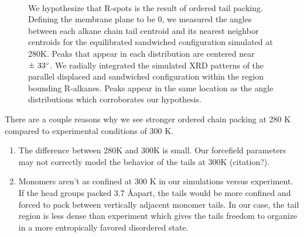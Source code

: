 \documentclass{article}
\begin{document}
\begin{figure}[!htb]
\begin{subfigure}{\linewidth}
\begin{subfigure}{0.45\textwidth}
		\end{subfigure}
	\end{subfigure} 
    \caption{We hypothesize that R-spots is the result of ordered tail packing.
	  Defining the membrane plane to be 0\degree, we measured the angles between each
	  alkane chain tail centroid and its nearest neighbor centroids for the
	  equilibrated sandwiched configuration simulated at 280K. Peaks
	  that appear in each distribution are centered near $\pm~33\degree$. We radially
	  integrated the simulated XRD patterns of the parallel displaced and sandwiched
	  configuration within the region bounding R-alkanes.
	  Peaks appear in the same location as the angle distributions which corroborates
	  our hypothesis.}~\label{fig:tail_packing}
  \end{figure}  
  
  There are a couple reasons why we see stronger ordered chain packing at 280 K compared to
  experimental conditions of 300 K.
  \begin{enumerate}
  		\item The difference between 280K and 300K is small. Our forcefield parameters
  		may not correctly model the behavior of the tails at 300K (citation?).
  		\item Monomers aren't as confined at 300 K in our simulations versus experiment.
  		If the head groups packed 3.7 \AA apart, the tails would be more confined and forced
  		to pack between vertically adjacent monomer tails. In our case, the tail region is
  		less dense than experiment which gives the tails freedom to organize in a more
  		entropically favored disordered state. 
  \end{enumerate}
\end{document}
